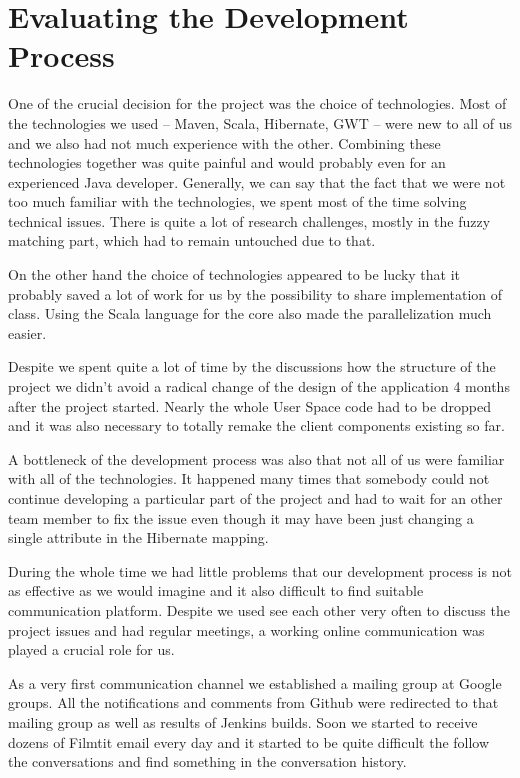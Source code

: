 \section{Evaluating the Development Process}

One of the crucial decision for the project was the choice of technologies. Most of the technologies we used -- Maven, Scala, Hibernate, GWT -- were new to all of us and we also had not much experience with the other. Combining these technologies together was quite painful and would probably even for an experienced Java developer. Generally, we can say that the fact that we were not too much familiar with the technologies, we spent most of the time solving technical issues. There is quite a lot of research challenges, mostly in the fuzzy matching part, which had to remain untouched due to that.

On the other hand the choice of technologies appeared to be lucky that it probably saved a lot of work for us by the possibility to share implementation of class. Using the Scala language for the core also made the parallelization much easier.

Despite we spent quite a lot of time by the discussions how the structure of the project we didn't avoid a radical change of the design of the application 4 months after the project started. Nearly the whole User Space code had to be dropped and it was also necessary to totally remake the client components existing so far.

A bottleneck of the development process was also that not all of us were familiar with all of the technologies. It happened many times that somebody could not continue developing a particular part of the project and had to wait for an other team member to fix the issue even though it may have been just changing a single attribute in the Hibernate mapping.

During the whole time we had little problems that our development process is not as effective as we would imagine and it also difficult to find suitable communication platform. Despite we used see each other very often to discuss the project issues and had regular meetings, a working online communication was played a crucial role for us.

As a very first communication channel we established a mailing group at Google groups. All the notifications and comments from Github were redirected to that mailing group as well as results of Jenkins builds. Soon we started to receive dozens of Filmtit email every day and it started to be quite difficult the follow the conversations and find something in the conversation history.

